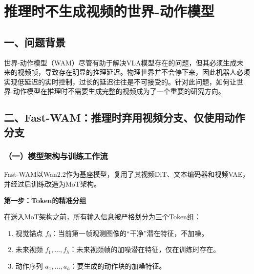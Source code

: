 \setcounter{section}{2}

\hypertarget{ux63a8ux7406ux65f6ux4e0dux751fux6210ux89c6ux9891ux7684ux4e16ux754c-ux52a8ux4f5cux6a21ux578b}{%
\section{推理时不生成视频的世界-动作模型}\label{ux63a8ux7406ux65f6ux4e0dux751fux6210ux89c6ux9891ux7684ux4e16ux754c-ux52a8ux4f5cux6a21ux578b}}

\hypertarget{ux4e00ux95eeux9898ux80ccux666f-10}{%
\subsection{一、问题背景}\label{ux4e00ux95eeux9898ux80ccux666f-10}}

世界-动作模型（WAM）尽管有助于解决VLA模型存在的问题，但其必须生成未来的视频帧，导致存在明显的推理延迟。物理世界并不会停下来，因此机器人必须实现低延迟的实时控制，过长的延迟往往是不可接受的。针对此问题，如何让世界-动作模型在推理时不需要生成完整的视频成为了一个重要的研究方向。

\hypertarget{ux4e8cfast-wamux63a8ux7406ux65f6ux5f03ux7528ux89c6ux9891ux5206ux652fux4ec5ux4f7fux7528ux52a8ux4f5cux5206ux652f}{%
\subsection{二、Fast-WAM：推理时弃用视频分支、仅使用动作分支}\label{ux4e8cfast-wamux63a8ux7406ux65f6ux5f03ux7528ux89c6ux9891ux5206ux652fux4ec5ux4f7fux7528ux52a8ux4f5cux5206ux652f}}

\hypertarget{ux4e00ux6a21ux578bux67b6ux6784ux4e0eux8badux7ec3ux5de5ux4f5cux6d41}{%
\subsubsection{（一）模型架构与训练工作流}\label{ux4e00ux6a21ux578bux67b6ux6784ux4e0eux8badux7ec3ux5de5ux4f5cux6d41}}

Fast-WAM以Wan2.2作为基座模型，复用了其视频DiT、文本编码器和视频VAE，并经过后训练改造为MoT架构。

\textbf{第一步：Token的精准分组}

在送入MoT架构之前，所有输入信息被严格划分为三个Token组：

\begin{enumerate}
\def\labelenumi{\arabic{enumi}.}
\tightlist
\item
  视觉锚点 \(f_0\)：当前第一帧观测图像的``干净''潜在特征，不加噪。
\item
  未来视频 \(f_1,\ldots,f_h\)：未来视频帧的加噪潜在特征，仅在训练时存在。
\item
  动作序列 \(a_1,\ldots,a_h\)：要生成的动作块的加噪特征。
\end{enumerate}

